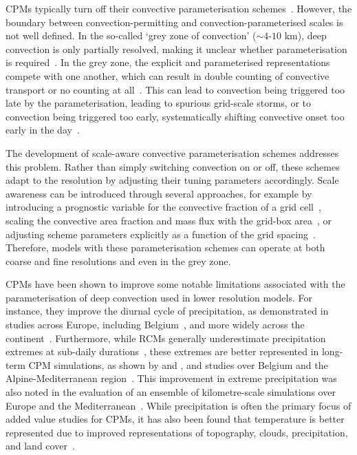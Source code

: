 \documentclass[journal abbreviation, manuscript]{copernicus}
\begin{document}
CPMs typically turn off their convective parameterisation schemes~\citep{coppola_first--its-kind_2020}.
However, the boundary between convection-permitting and convection-parameterised scales is not well defined.
In the so-called `grey zone of convection' ($\sim 4$-$10$ km), deep convection is only partially resolved, making it unclear whether parameterisation is required~\citep{vergara-temprado_climate_2020}.
In the grey zone, the explicit and parameterised representations compete with one another, which can result in double counting of convective transport or no counting at all~\citep{grossPhysicsDynamicsCoupling2018}.
This can lead to convection being triggered too late by the parameterisation, leading to spurious grid-scale storms, or to convection being triggered too early, systematically shifting convective onset too early in the day~\citep{grossPhysicsDynamicsCoupling2018}.

The development of scale-aware convective parameterisation schemes addresses this problem.
Rather than simply switching convection on or off, these schemes adapt to the resolution by adjusting their tuning parameters accordingly.
Scale awareness can be introduced through several approaches, for example by introducing a prognostic variable for the convective fraction of a grid cell~\citep{gerard_cloud_2009}, scaling the convective area fraction and mass flux with the grid-box area~\citep{grellScaleAerosolAware2014,hanUpdatesNCEPGFS2017}, or adjusting scheme parameters explicitly as a function of the grid spacing~\citep{zhengImprovingHighResolutionWeather2016a}.
Therefore, models with these parameterisation schemes can operate at both coarse and fine resolutions and even in the grey zone.

CPMs have been shown to improve some notable limitations associated with the parameterisation of deep convection used in lower resolution models. 
For instance, they improve the diurnal cycle of precipitation, as demonstrated in studies across Europe, including Belgium~\citep{de_troch_application_2016, brisson_how_2016}, and more widely across the continent~\citep{berthou_pan-european_2020}. 
Furthermore, while RCMs generally underestimate precipitation extremes at sub-daily durations~\citep{berg_summertime_2019}, these extremes are better represented in long-term CPM simulations, as shown by \citet{coppola_first--its-kind_2020} and \citet{fosser_convection-permitting_2024}, and studies over Belgium \citep{de_troch_multiscale_2013, tabari_local_2016, van_de_vyver_evaluation_2021} and the Alpine-Mediterranean region~\citep{muller_evaluation_2023, muller_climate_2024}. 
This improvement in extreme precipitation was also noted in the evaluation of an ensemble of kilometre-scale simulations over Europe and the Mediterranean~\citep{pichelli_first_2021, ban_first_2021, ha_precipitation_2024}. 
While precipitation is often the primary focus of added value studies for CPMs, it has also been found that temperature is better represented due to improved representations of topography, clouds, precipitation, and land cover~\citep{leutwyler_evaluation_2017, lucas-picher_convection-permitting_2021, soares_added_2022}.
\end{document}
